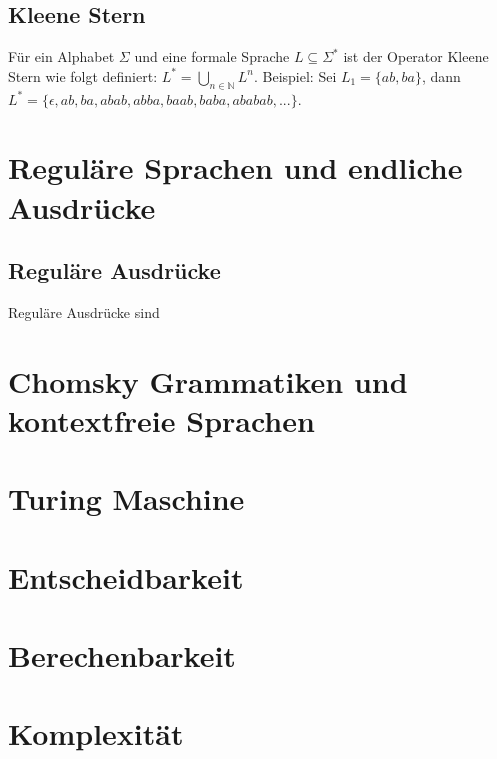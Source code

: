 \documentclass[12pt,a4paper]{article}
\begin{document}
\subsection{Kleene Stern}
Für ein Alphabet $\varSigma$ und eine formale Sprache $L \subseteq \varSigma^*$ ist der Operator Kleene Stern wie folgt definiert: $L^* = \underset{n \in \mathbb{N}}{\bigcup} L^n$.\newline \newline
Beispiel: Sei $L_1 = \{ ab, ba\}$, dann $L^* = \{\epsilon, ab, ba, abab, abba, baab, baba, ababab, ...\}$.

\section{Reguläre Sprachen und endliche Ausdrücke}
\subsection{Reguläre Ausdrücke}
Reguläre Ausdrücke sind 

\section{Chomsky Grammatiken und kontextfreie Sprachen}

\section{Turing Maschine}

\section{Entscheidbarkeit}

\section{Berechenbarkeit}

\section{Komplexität}
\end{document}
